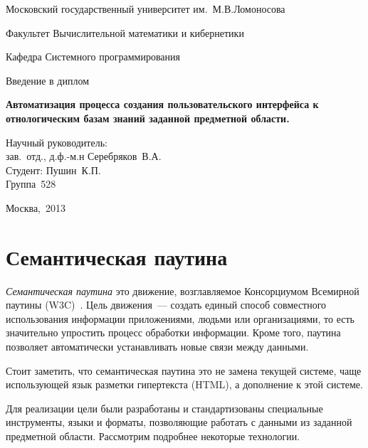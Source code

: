 \documentclass[a4paper, final, 14 pt]{extarticle}
\begin{document}
\begin{titlepage}
  \centerline{Московский государственный университет им.~М.В.Ломоносова}
  \centerline{Факультет Вычислительной математики и кибернетики}
  \smallskip
  \small
  \centerline{Кафедра Системного программирования}
  \centerline{\hfill\hrulefill\hrulefill\hfill}
  \vfill
  \vfill
  \vfill
  \Large
  \centerline{Введение в диплом}
  \Large
  \begin{centering}
  {\bf Автоматизация процесса создания пользовательского интерфейса к отнологическим базам знаний заданной предметной области.\\}
  \end{centering}
  \normalsize
  \vfill
  \vfill
  \vfill
  \vfill
  \begin{flushright}
  Научный руководитель:\\ зав.~отд., д.ф.-м.н Серебряков~В.А.\\
  \vfill
  Студент: Пушин~К.П.\\
  Группа~528\\
  \end{flushright}
  \vfill
  \vfill
  \vfill
  \centerline{Москва,~2013}
\end{titlepage}

\setcounter{page}{2}

\setcounter{tocdepth}{2}
\tableofcontents
\clearpage


\section{Семантическая паутина}

\emph{Семантическая паутина} это движение, возглавляемое Консорциумом 
Всемирной паутины (W3C)~\cite{article:semweb}. Цель движения~--- создать единый способ совместного 
использования информации приложениями, людьми или организациями, то есть значительно упростить 
процесс обработки информации. Кроме того, паутина позволяет автоматически устанавливать новые связи 
между данными.

Стоит заметить, что семантическая паутина это не замена текущей системе, чаще использующей язык 
разметки гипертекста (HTML), а дополнение к этой системе.

Для реализации цели были разработаны и стандартизованы специальные инструменты, языки и форматы, 
позволяющие работать с данными из заданной предметной области. Рассмотрим подробнее некоторые 
технологии.
\end{document}
